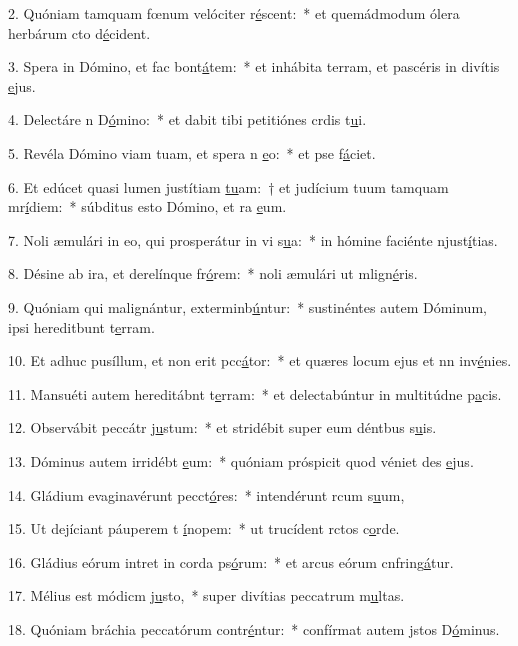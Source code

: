 2. Quóniam tamquam fœnum velóciter r\uline{é}scent:~* et quemádmodum ólera herbárum cto d\uline{é}cident.\par 
3. Spera in Dómino, et fac bont\uline{á}tem:~* et inhábita terram, et pascéris in divítis \uline{e}jus.\par 
4. Delectáre n D\uline{ó}mino:~* et dabit tibi petitiónes crdis t\uline{u}i.\par 
5. Revéla Dómino viam tuam, et spera n \uline{e}o:~* et pse f\uline{á}ciet.\par 
6. Et edúcet quasi lumen justítiam \uline{tu}am:~† et judícium tuum tamquam mr\uline{í}diem:~* súbditus esto Dómino, et ra \uline{e}um.\par 
7. Noli æmulári in eo, qui prosperátur in vi s\uline{u}a:~* in hómine faciénte njust\uline{í}tias.\par 
8. Désine ab ira, et derelínque fr\uline{ó}rem:~* noli æmulári ut mlign\uline{é}ris.\par 
9. Quóniam qui malignántur, exterminb\uline{ú}ntur:~* sustinéntes autem Dóminum, ipsi hereditbunt t\uline{e}rram.\par 
10. Et adhuc pusíllum, et non erit pcc\uline{á}tor:~* et quæres locum ejus et nn inv\uline{é}nies.\par 
11. Mansuéti autem hereditábnt t\uline{e}rram:~* et delectabúntur in multitúdne p\uline{a}cis.\par 
12. Observábit peccátr j\uline{u}stum:~* et stridébit super eum déntbus s\uline{u}is.\par 
13. Dóminus autem irridébt \uline{e}um:~* quóniam próspicit quod véniet des \uline{e}jus.\par 
14. Gládium evaginavérunt pecct\uline{ó}res:~* intendérunt rcum s\uline{u}um,\par 
15. Ut dejíciant páuperem t \uline{í}nopem:~* ut trucídent rctos c\uline{o}rde.\par 
16. Gládius eórum intret in corda ps\uline{ó}rum:~* et arcus eórum cnfring\uline{á}tur.\par 
17. Mélius est módicm j\uline{u}sto,~* super divítias peccatrum m\uline{u}ltas.\par 
18. Quóniam bráchia peccatórum contr\uline{é}ntur:~* confírmat autem jstos D\uline{ó}minus.\par 
